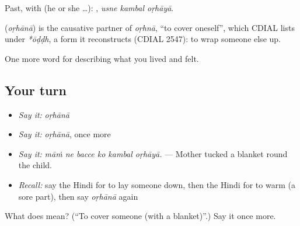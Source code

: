 Past, with  (he or she …):   , \emph{usne kambal oṛhāyā}.

\begin{cousinweb}
\textbf{} (\emph{oṛhānā}) is the causative partner of \emph{oṛhnā}, \textquotedblleft{}to cover oneself\textquotedblright{}, which CDIAL lists under \emph{*ōḍḍh}, a form it reconstructs (CDIAL 2547): to wrap someone else up.
\end{cousinweb}

\begin{grammarlens}[title={What you've built}]
One more word for describing what you lived and felt.
\end{grammarlens}

\subsection*{Your turn}
\begin{itemize}
\raggedright
  \item \emph{Say it:} \emph{oṛhānā}
  \item \emph{Say it:} \emph{oṛhānā}, once more
  \item \emph{Say it:} \emph{māṁ ne bacce ko kambal oṛhāyā.} — Mother tucked a blanket round the child.
  \item \emph{Recall:} say the Hindi for to lay someone down, then the Hindi for to warm (a sore part), then say \emph{oṛhānā} again
\end{itemize}

\begin{tcolorbox}[breakable,colback=teal!4,colframe=teal!35!black,title={Before you move on}]
What does  mean? (\textquotedblleft{}To cover someone (with a blanket)\textquotedblright{}.) Say it once more.
\end{tcolorbox}
